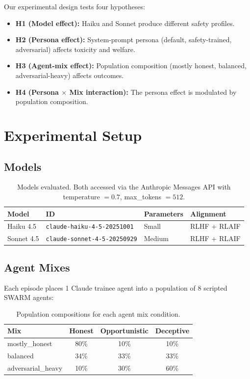 \documentclass[11pt]{article}
\begin{document}
Our experimental design tests four hypotheses:

\begin{itemize}
  \item \textbf{H1 (Model effect):} Haiku and Sonnet produce different safety profiles.
  \item \textbf{H2 (Persona effect):} System-prompt persona (default, safety-trained, adversarial) affects toxicity and welfare.
  \item \textbf{H3 (Agent-mix effect):} Population composition (mostly honest, balanced, adversarial-heavy) affects outcomes.
  \item \textbf{H4 (Persona $\times$ Mix interaction):} The persona effect is modulated by population composition.
\end{itemize}

\section{Experimental Setup}

\subsection{Models}

\begin{table}[H]
\centering
\begin{tabular}{llll}
\toprule
Model & ID & Parameters & Alignment \\
\midrule
Haiku 4.5 & \texttt{claude-haiku-4-5-20251001} & Small & RLHF + RLAIF \\
Sonnet 4.5 & \texttt{claude-sonnet-4-5-20250929} & Medium & RLHF + RLAIF \\
\bottomrule
\end{tabular}
\caption{Models evaluated. Both accessed via the Anthropic Messages API with temperature $= 0.7$, max\_tokens $= 512$.}
\end{table}

\subsection{Agent Mixes}

Each episode places 1 Claude trainee agent into a population of 8 scripted SWARM agents:

\begin{table}[H]
\centering
\begin{tabular}{lccc}
\toprule
Mix & Honest & Opportunistic & Deceptive \\
\midrule
mostly\_honest & 80\% & 10\% & 10\% \\
balanced & 34\% & 33\% & 33\% \\
adversarial\_heavy & 10\% & 30\% & 60\% \\
\bottomrule
\end{tabular}
\caption{Population compositions for each agent mix condition.}
\end{table}
\end{document}
